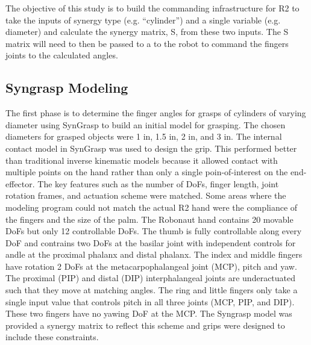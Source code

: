 \documentclass[letterpaper, 10 pt, conference]{ieeeconf}  %
\begin{document}
	The objective of this study is to build the commanding infrastructure for R2 to take the inputs of synergy type (e.g. “cylinder”) and a single variable (e.g. diameter) and calculate the synergy matrix, S, from these two inputs. The S matrix will need to then be passed to a to the robot to command the fingers joints to the calculated angles.

\subsection{Syngrasp Modeling}

The first phase is to determine the finger angles for grasps of cylinders of varying diameter using SynGrasp to build an initial model for grasping.  The chosen diameters for grasped objects were 1 in, 1.5 in, 2 in, and 3 in.  The internal contact model in SynGrasp was used to design the grip.  This performed better than traditional inverse kinematic models because it allowed contact with multiple points on the hand rather than only a single poin-of-interest on the end-effector.  The key features such as the number of DoFs, finger length, joint rotation frames, and actuation scheme were matched.  Some areas where the modeling program could not match the actual R2 hand were the compliance of the fingers and the size of the palm.  The Robonaut hand contains 20 movable DoFs but only 12 controllable DoFs.  The thumb is fully controllable along every DoF and contrains two DoFs at the basilar joint with independent controls for andle at the proximal phalanx and distal phalanx.  The index and middle fingers have rotation 2 DoFs at the metacarpophalangeal joint (MCP), pitch and yaw.  The proximal (PIP) and distal (DIP) interphalangeal joints are underactuated such that they move at matching angles.  The ring and little fingers only take a single input value that controls pitch in all three joints (MCP, PIP, and DIP).  These two fingers have no yawing DoF at the MCP.  The Syngrasp model was provided a synergy matrix to reflect this scheme and grips were designed to include these constraints. 
\end{document}
